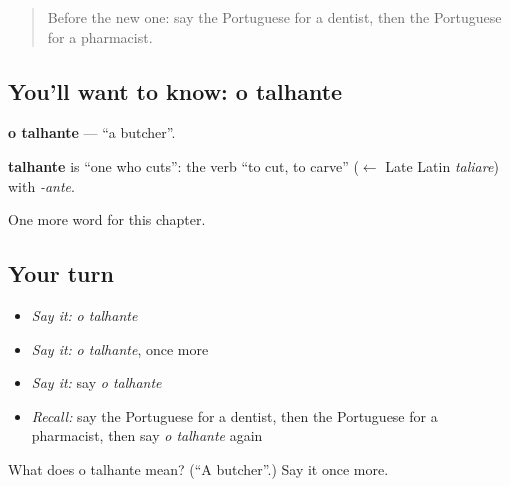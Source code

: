 \label{lesson:PT-C220-talhante}



\begin{quote}
Before the new one: say the Portuguese for a dentist, then the Portuguese for a pharmacist.
\end{quote}

\subsection*{You'll want to know: o talhante}
\textbf{o talhante} — \textquotedblleft{}a butcher\textquotedblright{}.

\begin{cousinweb}
\textbf{talhante} is \textquotedblleft{}one who cuts\textquotedblright{}: the verb \textquotedblleft{}to cut, to carve\textquotedblright{} ($\leftarrow$ Late Latin \emph{taliare}) with \emph{-ante}.
\end{cousinweb}

\begin{grammarlens}[title={What you've built}]
One more word for this chapter.
\end{grammarlens}

\subsection*{Your turn}
\begin{itemize}
\raggedright
  \item \emph{Say it:} \emph{o talhante}
  \item \emph{Say it:} \emph{o talhante}, once more
  \item \emph{Say it:} say \emph{o talhante}
  \item \emph{Recall:} say the Portuguese for a dentist, then the Portuguese for a pharmacist, then say \emph{o talhante} again
\end{itemize}

\begin{tcolorbox}[breakable,colback=teal!4,colframe=teal!35!black,title={Before you move on}]
What does o talhante mean? (\textquotedblleft{}A butcher\textquotedblright{}.) Say it once more.
\end{tcolorbox}
